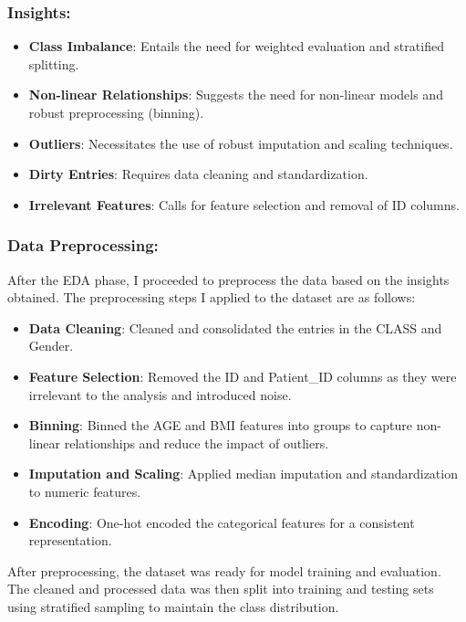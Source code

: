 ﻿\documentclass{article}
\begin{document}
\subsubsection*{Insights:}
		\begin{itemize}
			\item \textbf{Class Imbalance}: Entails the need for weighted evaluation and stratified splitting.
			\item \textbf{Non-linear Relationships}: Suggests the need for non-linear models and robust preprocessing (binning).
			\item \textbf{Outliers}: Necessitates the use of robust imputation and scaling techniques.
			\item \textbf{Dirty Entries}: Requires data cleaning and standardization.
			\item \textbf{Irrelevant Features}: Calls for feature selection and removal of ID columns.
		\end{itemize}

\subsubsection*{Data Preprocessing:}

After the EDA phase, I proceeded to preprocess the data based on the insights obtained.
The preprocessing steps I applied to the dataset are as follows:
\begin{itemize}
	\item \textbf{Data Cleaning}: Cleaned and consolidated the entries in the CLASS and Gender.
	\item \textbf{Feature Selection}: Removed the ID and Patient\_ID columns as they were irrelevant to the analysis and introduced noise.
	\item \textbf{Binning}: Binned the AGE and BMI features into groups to capture non-linear relationships and reduce the impact of outliers.
	\item \textbf{Imputation and Scaling}: Applied median imputation and standardization to numeric features.
	\item \textbf{Encoding}: One-hot encoded the categorical features for a consistent representation.
\end{itemize}

After preprocessing, the dataset was ready for model training and evaluation. 
The cleaned and processed data was then split into training and testing sets using stratified sampling to maintain the class distribution.
\end{document}
